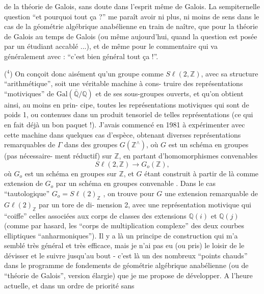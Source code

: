 
de la théorie de Galois, sans doute dans l'esprit même de Galois.
La sempiternelle question ``et pourquoi tout ça ?'' me paraît avoir
ni plus, ni moins de sens dans le cas de la géométrie algébrique
anabélienne en train de naître, que pour la théorie de Galois au
temps de Galois (ou même aujourd'hui, quand la question est posée
par un étudiant accablé ...), et de même pour le commentaire qui
va généralement avec : ``c'est bien général tout ça !''.

($^4$) On conçoit donc aisément qu'un groupe comme $S\ell(2,\mathbb{Z})$, avec
sa structure ``arithmétique'', soit une véritable machine à cons-%
truire des représentations ``motiviques'' de $\mathrm{Gal}(\bar{\mathbb{Q}}/\mathbb{Q})$ et de ses
sous-groupes ouverts, et qu'on obtient ainsi, au moins en prin-%
cipe, toutes les représentations motiviques qui sont de poids 1,
ou contenues dans un produit tensoriel de telles représentations
(ce qui en fait déjà un bon paquet !). J'avais commencé en 1981
à expérimenter avec cette machine dans quelques cas d'espèce,
obtenant diverses représentations remarquables de $\Gamma$ dans des
groupes $G(\mathbb{Z}^{\wedge})$, où $G$ est un schéma en groupes (pas nécessaire-%
ment réductif) sur $\mathbb{Z}$, en partant d'homomorphismes convenables
\[ S\ell(2,\mathbb{Z}) \longrightarrow G_o(\mathbb{Z}) , \]
où $G_o$ est un schéma en groupes sur $\mathbb{Z}$, et $G$ étant construit
à partir de là comme extension de $G_o$ par un schéma en groupes
convenable . Dans le cas ``tautologique'' $G_o = S\ell(2)_{\mathbb{Z}}$ , on trouve
pour $G$ une extension remarquable de $G\ell(2)_{\mathbb{Z}}$ par un tore de di-%
mension 2, avec une représentation motivique qui ``coiffe'' celles
associées aux corps de classes des extensions $\mathbb{Q}(i)$ et $\mathbb{Q}(j)$
(comme par hasard, les ``corps de multiplication complexe'' des deux
courbes elliptiques ``anharmoniques''). Il y a là un principe de
construction qui m'a semblé très général et très efficace, mais
je n'ai pas eu (ou pris) le loisir de le dévisser et le suivre
jusqu'au bout - c'est là un des nombreux ``points chauds'' dans le
programme de fondements de géométrie algébrique anabélienne (ou
de ``théorie de Galois'', version élargie) que je me propose de
développer. A l'heure actuelle, et dans un ordre de priorité sans

